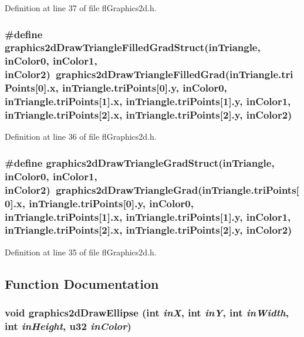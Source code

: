 Definition at line 37 of file fl\-Graphics2d.h.
\subsubsection{\setlength{\rightskip}{0pt plus 5cm}\#define graphics2d\-Draw\-Triangle\-Filled\-Grad\-Struct(in\-Triangle, in\-Color0, in\-Color1, in\-Color2)~graphics2d\-Draw\-Triangle\-Filled\-Grad(in\-Triangle.tri\-Points[0].x, in\-Triangle.tri\-Points[0].y, in\-Color0, in\-Triangle.tri\-Points[1].x, in\-Triangle.tri\-Points[1].y, in\-Color1, in\-Triangle.tri\-Points[2].x, in\-Triangle.tri\-Points[2].y, in\-Color2)}\label{flGraphics2d_8h_502c544342f0e87cf0f331b69e44f0d6}




Definition at line 36 of file fl\-Graphics2d.h.
\subsubsection{\setlength{\rightskip}{0pt plus 5cm}\#define graphics2d\-Draw\-Triangle\-Grad\-Struct(in\-Triangle, in\-Color0, in\-Color1, in\-Color2)~graphics2d\-Draw\-Triangle\-Grad(in\-Triangle.tri\-Points[0].x, in\-Triangle.tri\-Points[0].y, in\-Color0, in\-Triangle.tri\-Points[1].x, in\-Triangle.tri\-Points[1].y, in\-Color1, in\-Triangle.tri\-Points[2].x, in\-Triangle.tri\-Points[2].y, in\-Color2)}\label{flGraphics2d_8h_6f8c5eaf485bc1ba9b7a0cf2bbd66a22}




Definition at line 35 of file fl\-Graphics2d.h.

\subsection{Function Documentation}
\subsubsection{\setlength{\rightskip}{0pt plus 5cm}void graphics2d\-Draw\-Ellipse (int {\em in\-X}, int {\em in\-Y}, int {\em in\-Width}, int {\em in\-Height}, u32 {\em in\-Color})}\label{flGraphics2d_8h_1801c42fc90be61982c4fb7a77f0c44a}





